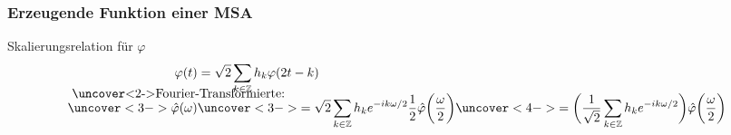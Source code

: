 %
%
%

%
%
\begin{frame}
\frametitle{Erzeugende Funktion einer MSA}
\begin{block}{Skalierungsrelation für $\varphi$}
\vspace{-20pt}
\begin{align*}
\varphi(t)
&=
\sqrt{2}
\sum_{k\in\mathbb Z} h_k\varphi(2t-k)
\\[-10pt]
\intertext{\vspace{-10pt} \uncover<2->{Fourier-Transformierte:}}
\uncover<3->{
\hat{\varphi}(\omega)}
&\uncover<3->{=
\sqrt{2}
\sum_{k\in\mathbb Z} h_k e^{-ik\omega/2}
\frac12\hat{\varphi}\biggl(\frac{\omega}2\biggr)}
\uncover<4->{=
\biggl(
\frac1{\sqrt{2}}
\sum_{k\in\mathbb Z} h_k e^{-ik\omega/2}
\biggr)
\hat{\varphi}\biggl(\frac{\omega}2\biggr)}
\end{align*}
\end{block}
\vspace{-10pt}

\begin{columns}[T,totalwidth=\textwidth]
\begin{column}{0.62\linewidth}
\end{column}
\begin{column}{0.35\linewidth}
\end{column}
\end{columns}
\end{frame}

